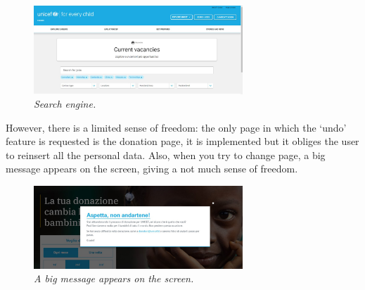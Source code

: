 \begin{figure}[!h]
	\begin{center}
		\includegraphics[width=0.7\textwidth]{FinalScores6.jpg}
		\captionsetup{font=small}
		\caption{\textit{Search engine.}}
	\end{center}
\end{figure}
\newline However, there is a limited sense of freedom: the only page in which the ‘undo’ feature is requested is the donation page, it is implemented but it obliges the user to reinsert all the personal data.
\newline Also, when you try to change page, a big message appears on the screen, giving a not much sense of freedom.
\begin{figure}[!h]
	\begin{center}
		\includegraphics[width=0.7\textwidth]{FinalScores7.jpg}
		\captionsetup{font=small}
		\caption{\textit{A big message appears on the screen.}}
	\end{center}
\end{figure}
\newline

